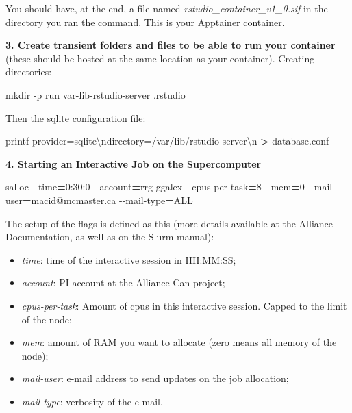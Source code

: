 \documentclass[
]{book}
\newenvironment{Shaded}{\begin{snugshade}}{\end{snugshade}}
\newcommand{\AttributeTok}[1]{\textcolor[rgb]{0.77,0.63,0.00}{#1}}
\newcommand{\BuiltInTok}[1]{#1}
\newcommand{\ExtensionTok}[1]{#1}
\newcommand{\FunctionTok}[1]{\textcolor[rgb]{0.00,0.00,0.00}{#1}}
\newcommand{\NormalTok}[1]{#1}
\newcommand{\OperatorTok}[1]{\textcolor[rgb]{0.81,0.36,0.00}{\textbf{#1}}}
\newcommand{\StringTok}[1]{\textcolor[rgb]{0.31,0.60,0.02}{#1}}
\providecommand{\tightlist}{%
  \setlength{\itemsep}{0pt}\setlength{\parskip}{0pt}}
\begin{document}
You should have, at the end, a file named \emph{rstudio\_container\_v1\_0.sif} in the
directory you ran the command. This is your Apptainer container.

\textbf{3. Create transient folders and files to be able to run your container} (these should be hosted at the same location as your container). Creating directories:

\begin{Shaded}
\begin{Highlighting}[]
\FunctionTok{mkdir} \AttributeTok{{-}p}\NormalTok{ run var{-}lib{-}rstudio{-}server .rstudio}
\end{Highlighting}
\end{Shaded}

Then the sqlite configuration file:

\begin{Shaded}
\begin{Highlighting}[]
\BuiltInTok{printf} \StringTok{\textquotesingle{}provider=sqlite\textbackslash{}ndirectory=/var/lib/rstudio{-}server\textbackslash{}n\textquotesingle{}} \OperatorTok{\textgreater{}}\NormalTok{ database.conf}
\end{Highlighting}
\end{Shaded}

\textbf{4. Starting an Interactive Job on the Supercomputer}

\begin{Shaded}
\begin{Highlighting}[]
\ExtensionTok{salloc} \AttributeTok{{-}{-}time}\OperatorTok{=}\NormalTok{0:30:0 }\AttributeTok{{-}{-}account}\OperatorTok{=}\NormalTok{rrg{-}ggalex }\AttributeTok{{-}{-}cpus{-}per{-}task}\OperatorTok{=}\NormalTok{8 }\AttributeTok{{-}{-}mem}\OperatorTok{=}\NormalTok{0 }\AttributeTok{{-}{-}mail{-}user}\OperatorTok{=}\NormalTok{macid@mcmaster.ca }\AttributeTok{{-}{-}mail{-}type}\OperatorTok{=}\NormalTok{ALL}
\end{Highlighting}
\end{Shaded}

The setup of the flags is defined as this (more details available at the Alliance Documentation, as well as on the Slurm manual):

\begin{itemize}
\tightlist
\item
  \emph{time}: time of the interactive session in HH:MM:SS;
\item
  \emph{account}: PI account at the Alliance Can project;
\item
  \emph{cpus-per-task}: Amount of cpus in this interactive session. Capped to the limit of the node;
\item
  \emph{mem}: amount of RAM you want to allocate (zero means all memory of the node);
\item
  \emph{mail-user}: e-mail address to send updates on the job allocation;
\item
  \emph{mail-type}: verbosity of the e-mail.
\end{itemize}
\end{document}
